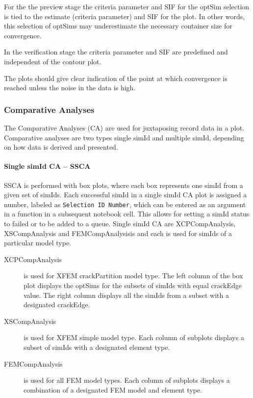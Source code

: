 \documentclass[10pt,a4paper]{article}
\begin{document}
For the the preview stage the criteria parameter and SIF for the optSim selection is tied to the estimate (criteria parameter) and SIF for the plot. In other words, this selection of optSims may underestimate the necessary container size for convergence.

In the verification stage the criteria parameter and SIF are predefined and independent of the contour plot.

The plots should give clear indication of the point at which convergence is reached unless the noise in the data is high.


\subsubsection{Comparative Analyses}

The Comparative Analyses (CA) are used for juxtaposing record data in a plot. Comparative analyses are two types single simId and multiple simId, depending on how data is derived and presented.


\paragraph{Single simId CA -- SSCA}\hfill \break
SSCA is performed with box plots, where each box represents one simId from a given set of simIds.
Each successful simId in a single simId CA plot is assigned a number, labeled as \texttt{Selection ID Number}, which can be entered as an argument in a function in a subsequent notebook cell. This allows for setting a simId status to failed or to be added to a queue.
Single simId CA are XCPCompAnalysis, XSCompAnalysis and FEMCompAnalysisis and each is used for simIds of a particular model type.


\begin{description}

\item[XCPCompAnalysis]
is used for XFEM crackPartition model type. The left column of the box plot displays the optSims for the subsets of simIds with equal crackEdge value. The right column displays all the simIds from a subset with a designated crackEdge.


\item[XSCompAnalysis]
is used for XFEM simple model type. Each column of subplots displays a subset of simIds with a designated element type.


\item[FEMCompAnalysis]
is used for all FEM model types. Each column of subplots displays a combination of a designated FEM model and element type.

\end{description}
\end{document}

